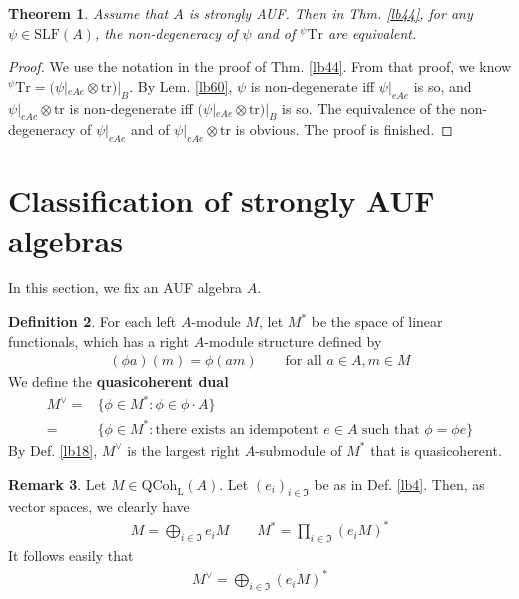 \documentclass[11pt,b5paper,notitlepage]{article}
\theoremstyle{definition}
\newtheorem{df}{Definition}[section]
\newtheorem{rem}[df]{Remark}
\theoremstyle{plain}
\newtheorem{thm}[df]{Theorem}
\newcommand{\fk}{\mathfrak}
\newcommand{\Tr}{\mathrm{Tr}}
\newcommand{\QC}{\mathrm{QCoh}_{\mathrm L}}
\newcommand{\SLF}{\mathrm{SLF}}
\newcommand{\trc}{\mathrm{tr}}
\numberwithin{equation}{section}
\begin{document}
\begin{thm}\label{lb64}
Assume that $A$ is strongly AUF. Then in Thm. \ref{lb44}, for any $\psi\in\SLF(A)$, the non-degeneracy of $\psi$ and of ${^\psi}\Tr$ are equivalent.
\end{thm}

\begin{proof}
We use the notation in the proof of Thm. \ref{lb44}. From that proof, we know ${^\psi}\Tr=(\psi|_{eAe}\otimes\trc)|_B$. By Lem. \ref{lb60}, $\psi$ is non-degenerate iff $\psi|_{eAe}$ is so, and $\psi|_{eAe}\otimes\trc$ is non-degenerate iff $(\psi|_{eAe}\otimes\trc)|_B$ is so. The equivalence of the non-degeneracy of $\psi|_{eAe}$ and of $\psi|_{eAe}\otimes\trc$ is obvious. The proof is finished. 
\end{proof}





\section{Classification of strongly AUF algebras}\label{lb63}



In this section, we fix an AUF algebra $A$. 

\begin{df}
For each left $A$-module $M$, let $M^*$ be the space of linear functionals, which has a right $A$-module structure defined by
\begin{align*}
(\phi a)(m)=\phi(am)\qquad \text{for all }a\in A,m\in M
\end{align*}
We define the \textbf{quasicoherent dual}
\begin{align*}
M^\vee=&\{\phi\in M^*:\phi\in\phi\cdot A\}\\
=&\{\phi\in M^*:\text{there exists an idempotent $e\in A$ such that $\phi=\phi e$}\}
\end{align*}
By Def. \ref{lb18}, $M^\vee$ is the largest right $A$-submodule of $M^*$ that is quasicoherent.
\end{df}


\begin{rem}\label{lb57}
Let $M\in\QC(A)$. Let $(e_i)_{i\in\fk I}$ be as in Def. \ref{lb4}. Then, as vector spaces, we clearly have
\begin{align*}
M=\bigoplus_{i\in\fk I}e_iM\qquad M^*=\prod_{i\in\fk I}(e_iM)^*
\end{align*}
It follows easily that
\begin{align*}
M^\vee=\bigoplus_{i\in\fk I}(e_iM)^*
\end{align*}
\end{rem}
\end{document}
